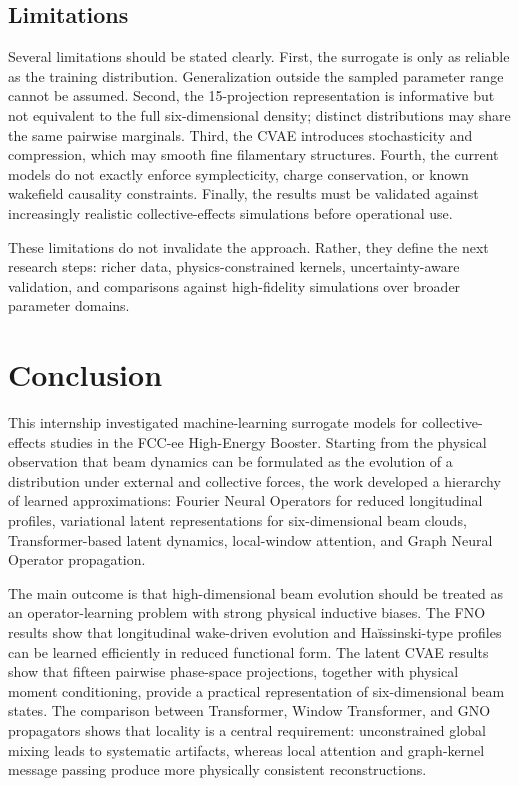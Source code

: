 \documentclass[11pt,a4paper]{article}
\begin{document}
\begin{sloppypar}
\subsection{Limitations}
Several limitations should be stated clearly. First, the surrogate is only as reliable as the training distribution. Generalization outside the sampled parameter range cannot be assumed. Second, the 15-projection representation is informative but not equivalent to the full six-dimensional density; distinct distributions may share the same pairwise marginals. Third, the CVAE introduces stochasticity and compression, which may smooth fine filamentary structures. Fourth, the current models do not exactly enforce symplecticity, charge conservation, or known wakefield causality constraints. Finally, the results must be validated against increasingly realistic collective-effects simulations before operational use.

These limitations do not invalidate the approach. Rather, they define the next research steps: richer data, physics-constrained kernels, uncertainty-aware validation, and comparisons against high-fidelity simulations over broader parameter domains.

\section{Conclusion}
\label{sec:conclusion}
This internship investigated machine-learning surrogate models for collective-effects studies in the FCC-ee High-Energy Booster. Starting from the physical observation that beam dynamics can be formulated as the evolution of a distribution under external and collective forces, the work developed a hierarchy of learned approximations: Fourier Neural Operators for reduced longitudinal profiles, variational latent representations for six-dimensional beam clouds, Transformer-based latent dynamics, local-window attention, and Graph Neural Operator propagation.

The main outcome is that high-dimensional beam evolution should be treated as an operator-learning problem with strong physical inductive biases. The FNO results show that longitudinal wake-driven evolution and Ha\"issinski-type profiles can be learned efficiently in reduced functional form. The latent CVAE results show that fifteen pairwise phase-space projections, together with physical moment conditioning, provide a practical representation of six-dimensional beam states. The comparison between Transformer, Window Transformer, and GNO propagators shows that locality is a central requirement: unconstrained global mixing leads to systematic artifacts, whereas local attention and graph-kernel message passing produce more physically consistent reconstructions.


\end{sloppypar}
\end{document}
